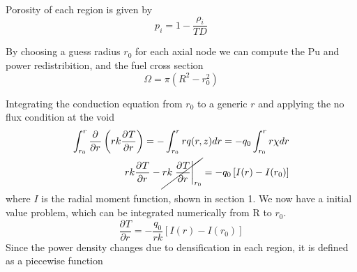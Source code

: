 \documentclass{article}
\newcommand{\pderiv}[3][]{\frac{\partial^{#1} #2}{\partial #3^{#1}}}
\begin{document}
Porosity of each region is given by
\[
  p_i = 1 - \frac{\rho_i}{TD}
\]

By choosing a guess radius \(r_0\) for each axial node we can compute the Pu and power redistribition, and the fuel cross section
\[
  \Omega = \pi(R^2 - r_0^2)
\]

Integrating the conduction equation from $r_0$ to a generic $r$ and applying the no flux condition at the void
\begin{align*} 
  \int_{r_0}^r \pderiv{}{r}\left(r k \pderiv{T}{r}\right) = -\int_{r_0}^r rq(r,z) dr = -q_0\int_{r_0}^r r\chi dr\\
r k \pderiv{T}{r} - \cancel{r k \left.\pderiv{T}{r}\right|_{r_0}} = -q_0\left[I(r) - I(r_0)\right]
\end{align*}
where $I$ is the radial moment function, shown in section 1. We now have a initial value problem, which can be integrated numerically from R to $r_0$.
\[
  \pderiv{T}{r} = -\frac{q_0}{rk}\left[I(r) - I(r_0)\right]
\]
Since the power density changes due to densification in each region, it is defined as a piecewise function
\end{document}
